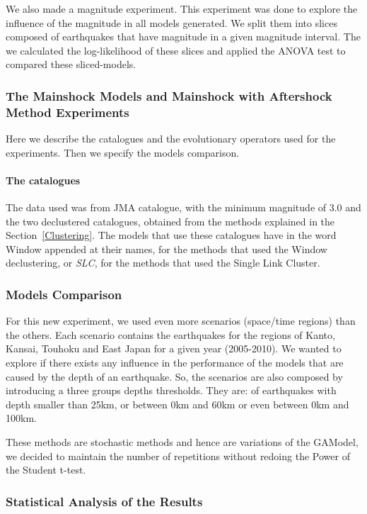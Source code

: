 We also made a magnitude experiment. This experiment was done to explore the influence of the magnitude in all models generated. We split them into slices composed of earthquakes that have magnitude in a given magnitude interval. The we calculated the log-likelihood of these slices and applied the ANOVA test to compared these sliced-models.


\subsubsection{The Mainshock Models and Mainshock with Aftershock Method Experiments}\label{bigExp}
 Here we describe the catalogues and the evolutionary operators used for the experiments. Then we specify the models comparison.
 
\paragraph{The catalogues}\label{catalogs}

The data used was from JMA catalogue, with the minimum magnitude of 3.0 and the two declustered catalogues, obtained from the methods explained in the Section~\ref{Clustering}. The models that use these catalogues have in the word Window appended at their names, for the methods that used the Window declustering, or \textit{SLC}, for the methods that used the Single Link Cluster. 

\subsubsection{Models Comparison}
For this new experiment, we used even more scenarios (space/time regions) than the others. Each scenario contains the earthquakes for the regions of Kanto, Kansai, Touhoku and East Japan for a given year (2005-2010). We wanted to explore if there exists any influence in the performance of the models that are caused by the depth of an earthquake. So, the scenarios are also composed by introducing a three groups depths thresholds. They are: of earthquakes with depth smaller than 25km, or between 0km and 60km or even between 0km and 100km.

These methods are stochastic methods and hence are variations of the GAModel, we decided to maintain the number of repetitions without redoing the Power of the Student t-test.

\subsubsection{Statistical Analysis of the Results}\label{anova}

